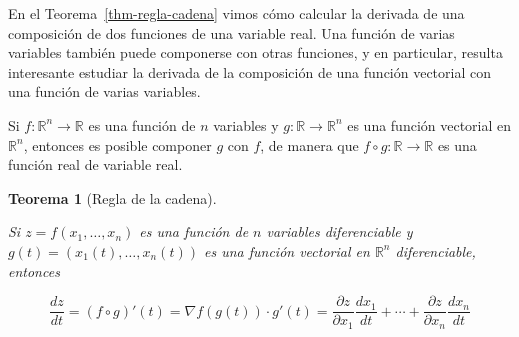 \documentclass[
  a4paper,
]{scrreport}
\theoremstyle{plain}
\theoremstyle{plain}
\newtheorem{theorem}{Teorema}[chapter]
\theoremstyle{definition}
\theoremstyle{definition}
\theoremstyle{plain}
\theoremstyle{definition}
\theoremstyle{remark}
\begin{document}
En el Teorema~\ref{thm-regla-cadena} vimos cómo calcular la derivada de
una composición de dos funciones de una variable real. Una función de
varias variables también puede componerse con otras funciones, y en
particular, resulta interesante estudiar la derivada de la composición
de una función vectorial con una función de varias variables.

Si \(f:\mathbb{R}^n\rightarrow \mathbb{R}\) es una función de \(n\)
variables y \(g:\mathbb{R}\rightarrow \mathbb{R}^n\) es una función
vectorial en \(\mathbb{R}^n\), entonces es posible componer \(g\) con
\(f\), de manera que \(f\circ g:\mathbb{R}\rightarrow \mathbb{R}\) es
una función real de variable real.

\begin{theorem}[Regla de la
cadena]\protect\hypertarget{thm-regla-cadena-funciones-varias-variables}{}\label{thm-regla-cadena-funciones-varias-variables}

Si \(z=f(x_1,\ldots,x_n)\) es una función de \(n\) variables
diferenciable y \(g(t)=(x_1(t),\ldots,x_n(t))\) es una función vectorial
en \(\mathbb{R}^n\) diferenciable, entonces

\[
\frac{dz}{dt} = (f\circ g)'(t) = \nabla f(g(t))\cdot g'(t) = \frac{\partial z}{\partial x_1}\frac{dx_1}{dt} + \cdots +\frac{\partial z}{\partial x_n}\frac{dx_n}{dt}
\]

\end{theorem}
\end{document}
